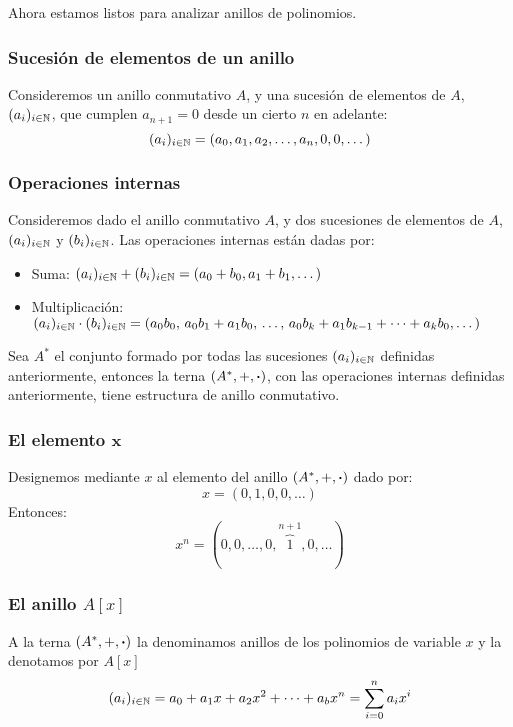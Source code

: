 Ahora estamos listos para analizar anillos de polinomios.

\subsubsection{Sucesión de elementos de un anillo}

Consideremos un anillo conmutativo $A$, y una sucesión de elementos de $A$, $(a_i)_{i \in \mathbb{N}}$, que cumplen $a_{n+1} = 0$ desde un cierto $n$ en adelante:
\[ (a_i)_{i \in \mathbb{N}} = (a_0, a_1, a_2, \dots, a_n, 0, 0, \dots)\]

\subsubsection{Operaciones internas}
Consideremos dado el anillo conmutativo $A$, y dos sucesiones de elementos de $A$, $(a_i)_{i \in \mathbb{N}}$ y $(b_i)_{i \in \mathbb{N}}$. Las operaciones internas están dadas por:
\begin{itemize}
	\item Suma: $(a_i)_{i \in \mathbb{N}} + (b_i)_{i \in \mathbb{N}} = (a_0 + b_0, a_1 + b_1, \dots)$
	\item Multiplicación: $(a_i)_{i \in \mathbb{N}} \cdot (b_i)_{i \in \mathbb{N}} = (a_0b_0, \, a_0b_1 + a_1b_0, \, \dots, \, a_0b_k + a_1 b_{k-1} + \dots + a_k b_0, \dots)$
\end{itemize}

\begin{fmd-theorem}
	Sea $A^*$ el conjunto formado por todas las sucesiones $(a_i)_{i \in \mathbb{N}}$ definidas anteriormente, entonces la terna $(A^*, +, \boldsymbol{\cdot})$, con las operaciones internas definidas anteriormente, tiene estructura de anillo conmutativo.
\end{fmd-theorem}

\subsubsection{El elemento $\mathbf{x}$}

Designemos mediante $x$ al elemento del anillo $(A^*, +, \boldsymbol{\cdot})$ dado por:
\[ x = (0, 1, 0, 0, \dots) \]
Entonces:
\[ x^n = (0, 0, \dots, 0, \overbrace{1}^{n+1}, 0, \dots) \]

\subsubsection{El anillo $A[x]$}
A la terna $(A^*, +, \boldsymbol{\cdot})$ la denominamos anillos de los polinomios de variable $x$ y la denotamos por $A[x]$
\[ (a_i)_{i\in \mathbb{N}} = a_0 + a_1 x + a_2 x^2 + \dots + a_b x^n = \sum_{i=0}^{n} a_i x^i \]

